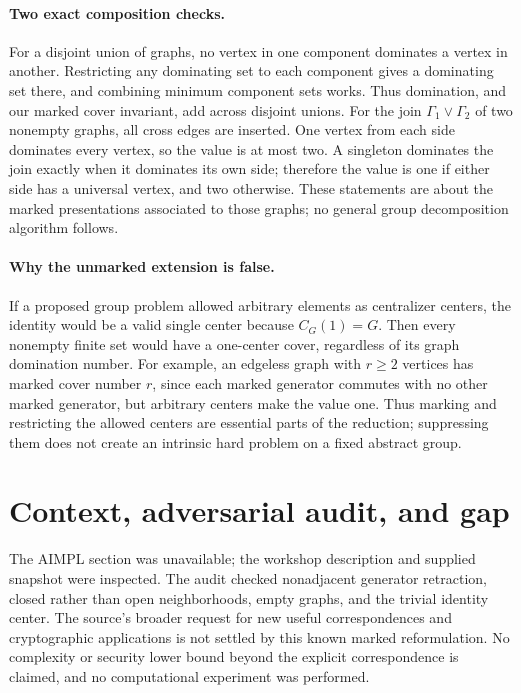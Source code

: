 \documentclass[11pt]{article}
\begin{document}
\paragraph{Two exact composition checks.}
For a disjoint union of graphs, no vertex in one component dominates a vertex
in another. Restricting any dominating set to each component gives a dominating
set there, and combining minimum component sets works. Thus domination, and
our marked cover invariant, add across disjoint unions.
For the join $\Gamma_1\vee\Gamma_2$ of two nonempty graphs, all cross edges
are inserted. One vertex from each side dominates every vertex, so the value
is at most two. A singleton dominates the join exactly when it dominates its
own side; therefore the value is one if either side has a universal vertex,
and two otherwise. These statements are about the marked presentations
associated to those graphs; no general group decomposition algorithm follows.

\paragraph{Why the unmarked extension is false.}
If a proposed group problem allowed arbitrary elements as centralizer centers,
the identity would be a valid single center because $C_G(1)=G$.
Then every nonempty finite set would have a one-center cover, regardless of
its graph domination number. For example, an edgeless graph with $r\ge2$
vertices has marked cover number $r$, since each marked generator commutes
with no other marked generator, but arbitrary centers make the value one.
Thus marking and restricting the allowed centers are essential parts of the
reduction; suppressing them does not create an intrinsic hard problem on a
fixed abstract group.

\section{Context, adversarial audit, and gap}
The AIMPL section was unavailable; the workshop description and supplied
snapshot were inspected. The audit checked nonadjacent generator retraction,
closed rather than open neighborhoods, empty graphs, and the trivial identity
center. The source's broader request for new useful correspondences and
cryptographic applications is not settled by this known marked reformulation.
No complexity or security lower bound beyond the explicit correspondence is
claimed, and no computational experiment was performed.
\end{document}
